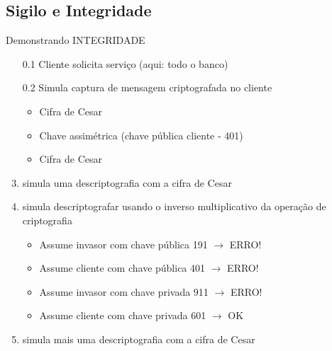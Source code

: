 \documentclass[xcolor=dvipsnames,table]{beamer}
\begin{document}
\subsection{Sigilo e Integridade}
\begin{frame}{Demonstrando INTEGRIDADE}
	\begin{enumerate}
		\item[0.1] Cliente solicita serviço (aqui: todo o banco)
		\item[0.2] Simula captura de mensagem criptografada no cliente
		\begin{itemize}
			\item Cifra de Cesar
			\item Chave assimétrica (chave pública cliente - 401)
			\item Cifra de Cesar
		\end{itemize} \pause
		\item simula uma descriptografia com a cifra de Cesar \pause
		\item simula descriptografar usando o inverso multiplicativo da operação de criptografia
		\begin{itemize}
			\item Assume invasor com chave pública 191 $\rightarrow$ ERRO! \pause
			\item Assume cliente com chave pública 401 $\rightarrow$ ERRO! \pause
			\item Assume invasor com chave privada 911 $\rightarrow$ ERRO! \pause
			\item Assume cliente com chave privada 601 $\rightarrow$ OK
		\end{itemize}
		\item simula mais uma descriptografia com a cifra de Cesar
	\end{enumerate}
\end{frame}
\end{document}
